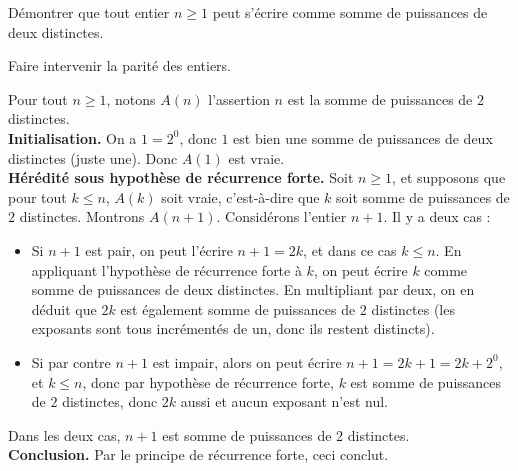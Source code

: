 \begin{exo}
Démontrer que tout entier $n\geq 1$ peut s'écrire comme somme de puissances de deux distinctes.
\begin{hint}
Faire intervenir la parité des entiers.
\end{hint}
\begin{sol}
Pour tout $n\geq 1$, notons $A(n)$ l'assertion \og $n$ est la somme de puissances de $2$ distinctes.\fg\\

\textbf{Initialisation.} On a $1 = 2^0$, donc $1$ est bien une somme de puissances de deux distinctes (juste une). Donc $A(1)$ est vraie.\\

\textbf{Hérédité sous hypothèse de récurrence forte.} Soit $n\geq 1$, et supposons que pour tout $k\leq n$, $A(k)$ soit vraie, c'est-à-dire que $k$ soit somme de puissances de $2$ distinctes.  Montrons $A(n+1)$. Considérons l'entier $n+1$. Il y a deux cas :
\begin{itemize}
\item Si $n+1$ est pair, on peut l'écrire $n+1=2k$, et dans ce cas $k\leq n$. En appliquant l'hypothèse de récurrence forte à $k$, on peut écrire $k$ comme somme de puissances de deux distinctes. En multipliant par deux, on en déduit que $2k$ est également somme de puissances de $2$ distinctes (les exposants sont tous incrémentés de un, donc ils restent distincts).
\item Si par contre $n+1$ est impair, alors on peut écrire $n+1 = 2k+1 = 2k+2^0$, et $k\leq n$, donc par hypothèse de récurrence forte, $k$ est somme de puissances de $2$ distinctes, donc $2k$ aussi et aucun exposant n'est nul.
\end{itemize}
Dans les deux cas, $n+1$ est somme de puissances de $2$ distinctes.\\
\textbf{Conclusion.} Par le principe de récurrence forte, ceci conclut.
\end{sol}
\end{exo}




